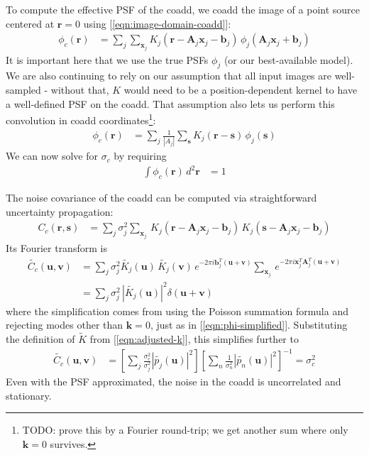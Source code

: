 \documentclass[DM,authoryear,toc]{lsstdoc}
\begin{document}
To compute the effective PSF of the coadd, we coadd the image of a point source centered at $\symbf{r}=0$ using [\ref{eqn:image-domain-coadd}]:
\begin{align}
    \phi_c(\symbf{r}) &= \sum_j \sum_{\symbf{x}_j} K_j\!\left(\symbf{r} - \symbf{A}_j\symbf{x}_j - \symbf{b}_j\right) \, \phi_j\!\left(\symbf{A}_j\symbf{x}_j + \symbf{b}_j\right)
    \label{eqn:psf-propagation-x}
\end{align}
It is important here that we use the true PSFs $\phi_j$ (or our best-available model).
We are also continuing to rely on our assumption that all input images are well-sampled - without that, $K$ would need to be a position-dependent kernel to have a well-defined PSF on the coadd.
That assumption also lets us perform this convolution in coadd coordinates\footnote{TODO: prove this by a Fourier round-trip; we get another sum where only $\symbf{k}=0$ survives.}:
\begin{align}
    \phi_c(\symbf{r}) &= \sum_j \frac{1}{|A_j|} \sum_{\symbf{s}} K_j\!\left(\symbf{r} - \symbf{s}\right) \, \phi_j\!\left(\symbf{s}\right)
    \label{eqn:psf-propagation-r}
\end{align}
We can now solve for $\sigma_c$ by requiring
\begin{align}
    \int\! \phi_c(\symbf{r}) \, d^2 \symbf{r} &= 1
\end{align}

The noise covariance of the coadd can be computed via straightforward uncertainty propagation:
\begin{align}
    C_c(\symbf{r}, \symbf{s}) &= \sum_j \sigma_j^2 \sum_{\symbf{x}_j} \,
        K_j\!\left(\symbf{r} - \symbf{A}_j\symbf{x}_j - \symbf{b}_j\right) \,
        K_j\!\left(\symbf{s} - \symbf{A}_j\symbf{x}_j - \symbf{b}_j\right)
    \label{eqn:approximate-psf-noise-propagation}
\end{align}
Its Fourier transform is
\begin{align}
    \widetilde{C_c}(\symbf{u}, \symbf{v}) &= \sum_j \sigma_j^2
        \widetilde{K_j}(\symbf{u}) \, \widetilde{K_j}(\symbf{v}) \,
        e^{-2\pi i \symbf{b}_j^T(\symbf{u} + \symbf{v})}
        \sum_{\symbf{x}_j} \, e^{-2\pi i \symbf{x}_j^{T} \symbf{A}_j^T (\symbf{u} + \symbf{v})} \\
    &= \sum_j \sigma_j^2 \, \left|\widetilde{K_j}(\symbf{u}) \right|^2 \delta(\symbf{u} + \symbf{v})
\end{align}
where the simplification comes from using the Poisson summation formula and rejecting modes other than $\symbf{k}=0$, just as in [\ref{eqn:phi-simplified}].
Substituting the definition of $\widetilde{K}$ from [\ref{eqn:adjusted-k}], this simplifies further to
\begin{align}
    \widetilde{C_c}(\symbf{u}, \symbf{v}) &=
        \left[\sum_j \frac{\sigma_c^2}{\sigma_j^2} \left|\widetilde{p_j}(\symbf{u})\right|^2\right]
        \left[\sum_n \frac{1}{\sigma_n^2} \left|\widetilde{p_n}(\symbf{u})\right|^2\right]^{-1}
        = \sigma_c^2
\end{align}
Even with the PSF approximated, the noise in the coadd is uncorrelated and stationary.
\end{document}
